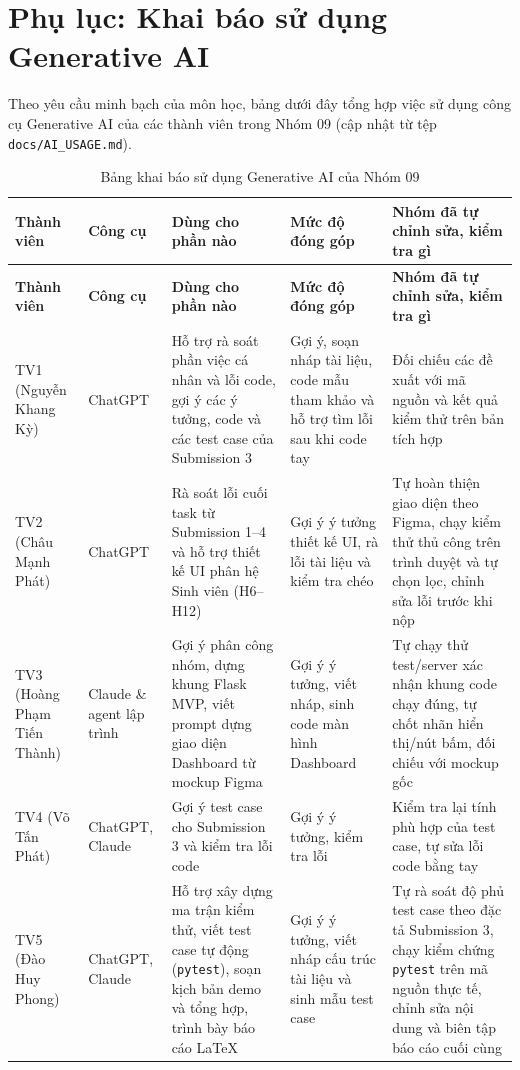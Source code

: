 \section*{Phụ lục: Khai báo sử dụng Generative AI}

Theo yêu cầu minh bạch của môn học, bảng dưới đây tổng hợp việc sử dụng công cụ Generative AI của các thành viên trong Nhóm 09 (cập nhật từ tệp \texttt{docs/AI\_USAGE.md}).

\begin{longtable}{|p{2.3cm}|p{2.1cm}|p{3.0cm}|p{2.5cm}|p{3.5cm}|}
\caption{Bảng khai báo sử dụng Generative AI của Nhóm 09} \\
\hline
\textbf{Thành viên} & \textbf{Công cụ} & \textbf{Dùng cho phần nào} & \textbf{Mức độ đóng góp} & \textbf{Nhóm đã tự chỉnh sửa, kiểm tra gì} \\
\hline
\endfirsthead
\hline
\textbf{Thành viên} & \textbf{Công cụ} & \textbf{Dùng cho phần nào} & \textbf{Mức độ đóng góp} & \textbf{Nhóm đã tự chỉnh sửa, kiểm tra gì} \\
\hline
\endhead
TV1 (Nguyễn Khang Kỳ) & ChatGPT & Hỗ trợ rà soát phần việc cá nhân và lỗi code, gợi ý các ý tưởng, code và các test case của Submission 3 & Gợi ý, soạn nháp tài liệu, code mẫu tham khảo và hỗ trợ tìm lỗi sau khi code tay & Đối chiếu các đề xuất với mã nguồn và kết quả kiểm thử trên bản tích hợp \\ \hline
TV2 (Châu Mạnh Phát) & ChatGPT & Rà soát lỗi cuối task từ Submission 1--4 và hỗ trợ thiết kế UI phân hệ Sinh viên (H6--H12) & Gợi ý ý tưởng thiết kế UI, rà lỗi tài liệu và kiểm tra chéo & Tự hoàn thiện giao diện theo Figma, chạy kiểm thử thủ công trên trình duyệt và tự chọn lọc, chỉnh sửa lỗi trước khi nộp \\ \hline
TV3 (Hoàng Phạm Tiến Thành) & Claude \& agent lập trình & Gợi ý phân công nhóm, dựng khung Flask MVP, viết prompt dựng giao diện Dashboard từ mockup Figma & Gợi ý ý tưởng, viết nháp, sinh code màn hình Dashboard & Tự chạy thử test/server xác nhận khung code chạy đúng, tự chốt nhãn hiển thị/nút bấm, đối chiếu với mockup gốc \\ \hline
TV4 (Võ Tấn Phát) & ChatGPT, Claude & Gợi ý test case cho Submission 3 và kiểm tra lỗi code & Gợi ý ý tưởng, kiểm tra lỗi & Kiểm tra lại tính phù hợp của test case, tự sửa lỗi code bằng tay \\ \hline
TV5 (Đào Huy Phong) & ChatGPT, Claude & Hỗ trợ xây dựng ma trận kiểm thử, viết test case tự động (\texttt{pytest}), soạn kịch bản demo và tổng hợp, trình bày báo cáo LaTeX & Gợi ý ý tưởng, viết nháp cấu trúc tài liệu và sinh mẫu test case & Tự rà soát độ phủ test case theo đặc tả Submission 3, chạy kiểm chứng \texttt{pytest} trên mã nguồn thực tế, chỉnh sửa nội dung và biên tập báo cáo cuối cùng \\ \hline
\end{longtable}
